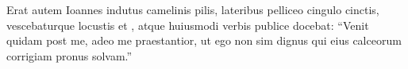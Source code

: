 \documentclass[12pt]{article}
\newcommand{\bv}[1]{\linenumannotation{#1}}
\begin{document}
	\beginnumbering
	\pstart
  \bv{6} Erat autem Ioannes indutus camelinis pilis, lateribus pelliceo cingulo cinctis, vescebaturque locustis et , atque huiusmodi verbis publice docebat:\bv{7} “Venit quidam post me, adeo me praestantior, ut ego non sim dignus qui eius calceorum corrigiam pronus solvam.”
	\pend
	\endnumbering

\end{document}
